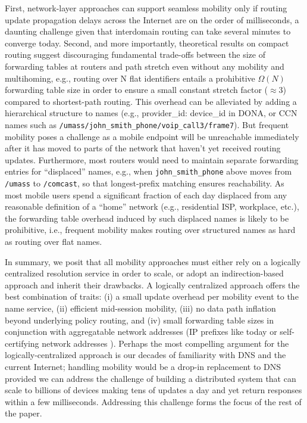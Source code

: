 {First, network-layer approaches can support seamless mobility only if routing update propagation delays across the Internet are on the order of milliseconds, a daunting challenge given that interdomain routing can take several minutes to converge today. Second, and more importantly, theoretical results on compact routing \cite{compact-routing} suggest discouraging fundamental trade-offs between the size of forwarding tables at routers and path stretch even without any mobility and multihoming, e.g.,  routing over N flat identifiers entails a prohibitive $\Omega(N)$ forwarding table size in order to ensure a small constant stretch factor ($\approx$3) compared to shortest-path routing.  This overhead can be alleviated by adding a hierarchical structure to names (e.g., provider\_id: device\_id in DONA, or CCN names such as  \verb+/umass/john_smith_phone/voip_call3/frame7+). But frequent mobility poses a challenge as a mobile endpoint will be unreachable immediately after it has moved to parts of the network that haven't yet received routing updates. Furthermore, most routers would need to maintain separate forwarding entries for ``displaced'' names, e.g., when \verb+john_smith_phone+ above moves from \verb+/umass+ to \verb+/comcast+, so that longest-prefix matching ensures reachability.
As most mobile users spend a significant fraction of each day displaced from any reasonable definition of a ``home'' network (e.g., residential ISP, workplace, etc.), the forwarding table overhead induced by such displaced names is likely to be prohibitive, i.e., frequent mobility makes routing over structured names as hard as routing over flat names.

In {summary}, we posit that all mobility approaches must either rely on a logically centralized resolution service in order to scale, or adopt an indirection-based approach and inherit their drawbacks. A logically centralized approach offers the best combination of traits: (i) a small update overhead per mobility event to the name service, (ii) efficient mid-session mobility, (iii) no data path inflation beyond underlying policy routing, and (iv) small forwarding table sizes in conjunction with aggregatable network addresses (IP prefixes like today or self-certifying network addresses \cite{MobilityFirst-UMASS,XIA}).
 Perhaps the most compelling argument for the logically-centralized approach is our decades of familiarity with DNS and the current Internet; handling mobility would be a drop-in replacement to DNS provided we can address the challenge of building a distributed system that can scale to billions of devices making tens of updates a day and yet return responses within a few milliseconds. Addressing this challenge forms the focus of the rest of the paper.

}




